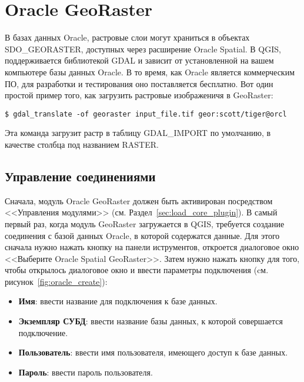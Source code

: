 
\section{Oracle GeoRaster}


В базах данных Oracle, растровые слои могут храниться в объектах
SDO\_GEORASTER, доступных через расширение Oracle Spatial. В QGIS,
 поддерживается
библиотекой GDAL и зависит от установленной на вашем компьютере базы
данных Oracle. В то время, как Oracle является коммерческим ПО, для
разработки и тестирования оно поставляется бесплатно. Вот один простой
пример того, как загрузить растровые изображеничя в GeoRaster:

\begin{verbatim}
$ gdal_translate -of georaster input_file.tif geor:scott/tiger@orcl
\end{verbatim}

Эта команда загрузит растр в таблицу GDAL\_IMPORT по умолчанию, в
качестве столбца под названием RASTER.

\subsection{Управление соединениями}

Сначала, модуль Oracle GeoRaster должен быть активирован посредством
<<Управления модулями>> (см. Раздел~\ref{sec:load_core_plugin}). В самый
первый раз, когда модуль GeoRaster загружается в QGIS, требуется
создание соединения с базой данных Oracle, в которой содержатся данные.
Для этого сначала нужно нажать кнопку
 на панели
иструментов, откроется диалоговое окно <<Выберите Oracle Spatial GeoRaster>>.
Затем нужно нажать кнопку  для того, чтобы открылось
диалоговое окно и ввести параметры подключения (cм. рисунок~\ref{fig:oracle_create}):

\begin{itemize}[label=--]
\item \textbf{Имя}: ввести название для подключения к базе данных.
\item \textbf{Экземпляр СУБД}: ввести название базы данных, к которой
совершается подключение.
\item \textbf{Пользователь}: ввести имя пользователя, имеющего доступ
к базе данных.
\item \textbf{Пароль}: ввести пароль пользователя.
\end{itemize}

